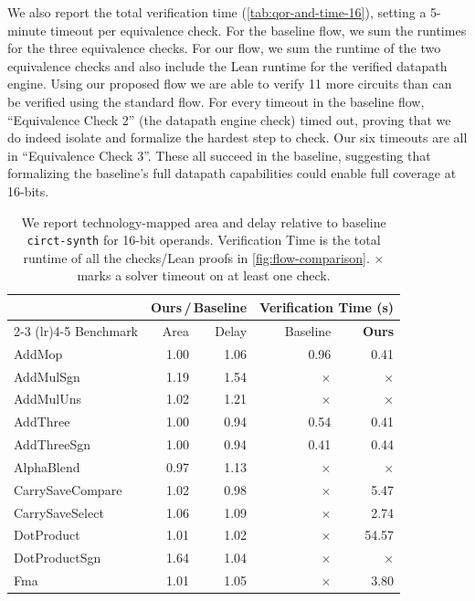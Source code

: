 \documentclass[conference]{IEEEtran}
\theoremstyle{plain}
\theoremstyle{definition}
\begin{document}
We also report the total verification time (\autoref{tab:qor-and-time-16}), setting a 5-minute timeout per equivalence check.
For the baseline flow, we sum the runtimes for the three equivalence checks.
For our flow, we sum the runtime of the two equivalence checks and also include the Lean runtime for the verified datapath engine.
Using our proposed flow we are able to verify 11 more circuits than can be verified using the standard flow.
For every timeout in the baseline flow, ``Equivalence Check 2'' (the datapath engine check) timed out,
proving that we do indeed isolate and formalize the hardest step to check.
Our six timeouts are all in ``Equivalence Check 3''.
These all succeed in the baseline,
suggesting that formalizing the baseline's full datapath capabilities could enable full coverage at 16-bits.


\begin{table}
  \centering
  \caption{
  We report technology-mapped area and delay relative to baseline \texttt{circt-synth} for 16-bit operands. 
  Verification Time is the total runtime of all the checks/Lean proofs in \autoref{fig:flow-comparison}. 
  $\times$ marks a solver timeout on at least one check.}
  \label{tab:qor-and-time-16}
  \small
  \setlength{\tabcolsep}{4pt}
  \begin{tabular}{lrrrr}
    \toprule
    & \multicolumn{2}{c}{\textbf{Ours}\,/\,Baseline} & \multicolumn{2}{c}{Verification Time (s)} \\
    \cmidrule(lr){2-3} \cmidrule(lr){4-5}
    Benchmark & Area & Delay & Baseline & \textbf{Ours} \\
    \midrule
    AddMop & 1.00 & 1.06 & 0.96 & 0.41 \\
    AddMulSgn & 1.19 & 1.54 & $\times$ & $\times$ \\
    AddMulUns & 1.02 & 1.21 & $\times$ & $\times$ \\
    AddThree & 1.00 & 0.94 & 0.54 & 0.41 \\
    AddThreeSgn & 1.00 & 0.94 & 0.41 & 0.44 \\
    AlphaBlend & 0.97 & 1.13 & $\times$ & $\times$ \\
    CarrySaveCompare & 1.02 & 0.98 & $\times$ & 5.47 \\
    CarrySaveSelect & 1.06 & 1.09 & $\times$ & 2.74 \\
    DotProduct & 1.01 & 1.02 & $\times$ & 54.57 \\
    DotProductSgn & 1.64 & 1.04 & $\times$ & $\times$ \\
    Fma & 1.01 & 1.05 & $\times$ & 3.80 \\

\end{tabular}
\end{table}
\end{document}
